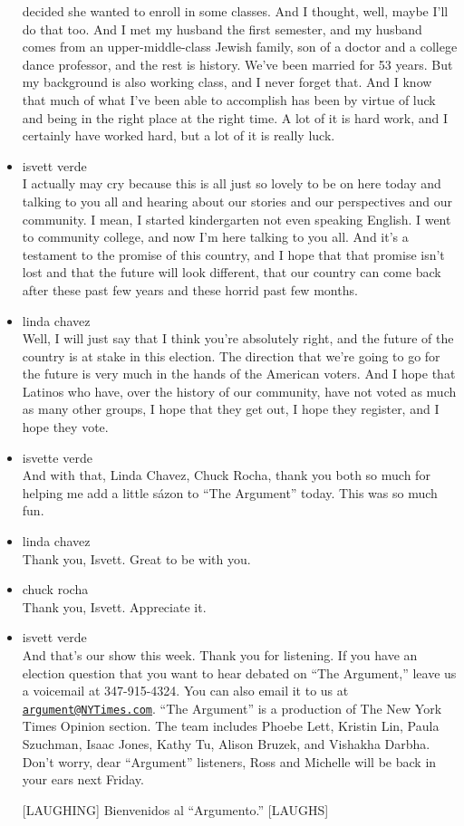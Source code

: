 \begin{itemize}
  decided she wanted to enroll in some classes. And I thought, well,
  maybe I'll do that too. And I met my husband the first semester, and
  my husband comes from an upper-middle-class Jewish family, son of a
  doctor and a college dance professor, and the rest is history. We've
  been married for 53 years. But my background is also working class,
  and I never forget that. And I know that much of what I've been able
  to accomplish has been by virtue of luck and being in the right place
  at the right time. A lot of it is hard work, and I certainly have
  worked hard, but a lot of it is really luck.
\item
  isvett verde\\
  I actually may cry because this is all just so lovely to be on here
  today and talking to you all and hearing about our stories and our
  perspectives and our community. I mean, I started kindergarten not
  even speaking English. I went to community college, and now I'm here
  talking to you all. And it's a testament to the promise of this
  country, and I hope that that promise isn't lost and that the future
  will look different, that our country can come back after these past
  few years and these horrid past few months.
\item
  linda chavez\\
  Well, I will just say that I think you're absolutely right, and the
  future of the country is at stake in this election. The direction that
  we're going to go for the future is very much in the hands of the
  American voters. And I hope that Latinos who have, over the history of
  our community, have not voted as much as many other groups, I hope
  that they get out, I hope they register, and I hope they vote.
\item
  isvette verde\\
  And with that, Linda Chavez, Chuck Rocha, thank you both so much for
  helping me add a little sázon to ``The Argument'' today. This was so
  much fun.
\item
  linda chavez\\
  Thank you, Isvett. Great to be with you.
\item
  chuck rocha\\
  Thank you, Isvett. Appreciate it.
\item
  isvett verde\\
  And that's our show this week. Thank you for listening. If you have an
  election question that you want to hear debated on ``The Argument,''
  leave us a voicemail at 347-915-4324. You can also email it to us at
  \href{mailto:argument@NYTimes.com}{\nolinkurl{argument@NYTimes.com}}.
  ``The Argument'' is a production of The New York Times Opinion
  section. The team includes Phoebe Lett, Kristin Lin, Paula Szuchman,
  Isaac Jones, Kathy Tu, Alison Bruzek, and Vishakha Darbha. Don't
  worry, dear ``Argument'' listeners, Ross and Michelle will be back in
  your ears next Friday.

  {[}LAUGHING{]} Bienvenidos al ``Argumento.'' {[}LAUGHS{]}
\end{itemize}

